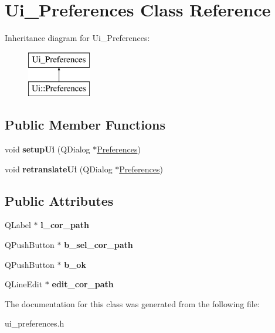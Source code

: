 \hypertarget{classUi__Preferences}{\section{Ui\-\_\-\-Preferences Class Reference}
\label{classUi__Preferences}
}
Inheritance diagram for Ui\-\_\-\-Preferences\-:\begin{figure}[H]
\begin{center}
\leavevmode
\includegraphics[height=2.000000cm]{classUi__Preferences}
\end{center}
\end{figure}
\subsection*{Public Member Functions}
\begin{DoxyCompactItemize}
\item 
\hypertarget{classUi__Preferences_a2c535ca36a3133132a7c858a4972df85}{void {\bfseries setup\-Ui} (Q\-Dialog $\ast$\hyperlink{classPreferences}{Preferences})}\label{classUi__Preferences_a2c535ca36a3133132a7c858a4972df85}

\item 
\hypertarget{classUi__Preferences_ab767b13e8a1f7e884935d112f2e17ab2}{void {\bfseries retranslate\-Ui} (Q\-Dialog $\ast$\hyperlink{classPreferences}{Preferences})}\label{classUi__Preferences_ab767b13e8a1f7e884935d112f2e17ab2}

\end{DoxyCompactItemize}
\subsection*{Public Attributes}
\begin{DoxyCompactItemize}
\item 
\hypertarget{classUi__Preferences_aeec4418a22113c5f68fed2f7052e957b}{Q\-Label $\ast$ {\bfseries l\-\_\-cor\-\_\-path}}\label{classUi__Preferences_aeec4418a22113c5f68fed2f7052e957b}

\item 
\hypertarget{classUi__Preferences_aaca93089ea37edb8c222021c4cee0b93}{Q\-Push\-Button $\ast$ {\bfseries b\-\_\-sel\-\_\-cor\-\_\-path}}\label{classUi__Preferences_aaca93089ea37edb8c222021c4cee0b93}

\item 
\hypertarget{classUi__Preferences_a9bfc592da0ab1e899f5803f4ce62fbfb}{Q\-Push\-Button $\ast$ {\bfseries b\-\_\-ok}}\label{classUi__Preferences_a9bfc592da0ab1e899f5803f4ce62fbfb}

\item 
\hypertarget{classUi__Preferences_a827c0e4bb5cd87403b3dadf83fee1c1f}{Q\-Line\-Edit $\ast$ {\bfseries edit\-\_\-cor\-\_\-path}}\label{classUi__Preferences_a827c0e4bb5cd87403b3dadf83fee1c1f}

\end{DoxyCompactItemize}


The documentation for this class was generated from the following file\-:\begin{DoxyCompactItemize}
\item 
ui\-\_\-preferences.\-h\end{DoxyCompactItemize}
